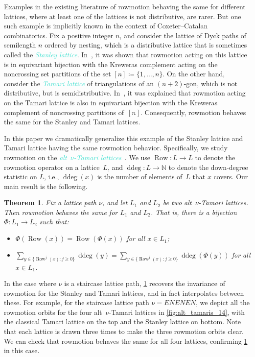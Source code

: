 \documentclass[11pt]{amsart}
\DeclareMathOperator{\row}{Row}
\DeclareMathOperator{\ddeg}{ddeg}
\newcommand{\dfn}[1]{\textcolor{Turquoise}{\emph{#1}}}
\newtheorem{theorem}{Theorem}[section]
\theoremstyle{definition}
\begin{document}
Examples in the existing literature of rowmotion behaving the same for different lattices, where at least one of the lattices is not distributive, are rarer. But one such example is implicitly known in the context of Coxeter--Catalan combinatorics. Fix a positive integer $n$, and consider the lattice of Dyck paths of semilength $n$ ordered by nesting, which is a distributive lattice that is sometimes called the \dfn{Stanley lattice}. In~\cite{armstrong2013uniform}, it was shown that rowmotion acting on this lattice is in equivariant bijection with the Kreweras complement acting on the noncrossing set partitions of the set $[n]\coloneq\{1,\ldots,n\}$. On the other hand, consider the \dfn{Tamari lattice} of triangulations of an $(n+2)$-gon, which is not distributive, but is semidistributive. In~\cite{barnard2019canonical}, it was explained that rowmotion acting on the Tamari lattice is also in equivariant bijection with the Kreweras complement of noncrossing partitions of~$[n]$. Consequently, rowmotion behaves the same for the Stanley and Tamari lattices.

In this paper we dramatically generalize this example of the Stanley lattice and Tamari lattice having the same rowmotion behavior. Specifically, we study rowmotion on the \dfn{alt~$\nu$-Tamari lattices}~\cite{ceballos2024altnu}. We use $\row\colon L \to L$ to denote the rowmotion operator on a lattice~$L$, and $\ddeg\colon L \to \mathbb{N}$ to denote the down-degree statistic on $L$, i.e., $\ddeg(x)$ is the number of elements of~$L$ that $x$ covers. Our main result is the following. 

\begin{theorem} \label{thm:intro_main}
Fix a lattice path $\nu$, and let $L_1$ and $L_2$ be two alt~$\nu$-Tamari lattices. Then rowmotion behaves the same for $L_1$ and $L_2$. That is, there is a bijection $\Phi\colon L_1 \to L_2$ such that:
\begin{itemize}
\item $\Phi( \row (x) ) = \row (\Phi (x))$ for all $x \in L_1$;
\item $\sum_{y \in \{\row^j(x)\colon j\geq 0\}} \ddeg(y) = \sum_{y \in \{\row^j(x)\colon j\geq 0\}} \ddeg(\Phi(y))$ for all $x \in L_1$.
\end{itemize} 
\end{theorem}

In the case where $\nu$ is a staircase lattice path, \cref{thm:intro_main} recovers the invariance of rowmotion for the Stanley and Tamari lattices, and in fact interpolates between these. For example, for the staircase lattice path $\nu=ENENEN$, we depict all the rowmotion orbits for the four alt~$\nu$-Tamari lattices in \cref{fig:alt_tamaris_14}, with the classical Tamari lattice on the top and the Stanley lattice on bottom. Note that each lattice is drawn three times to make the three rowmotion orbits clear. We can check that rowmotion behaves the same for all four lattices, confirming \cref{thm:intro_main} in this case.
\end{document}
